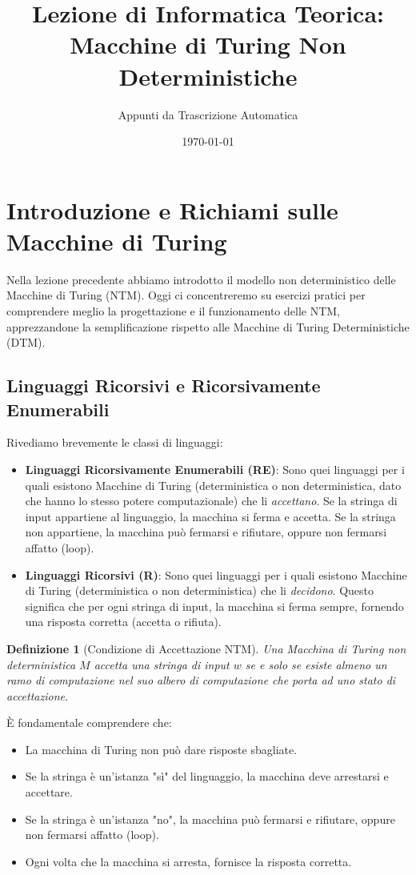 \documentclass[a4paper]{article}
\title{Lezione di Informatica Teorica: Macchine di Turing Non Deterministiche}
\author{Appunti da Trascrizione Automatica}
\date{\today}
\newtheorem{definition}{Definizione}[section]
\begin{document}
\maketitle
\tableofcontents
\newpage

\section{Introduzione e Richiami sulle Macchine di Turing}

Nella lezione precedente abbiamo introdotto il modello non deterministico delle Macchine di Turing (NTM). Oggi ci concentreremo su esercizi pratici per comprendere meglio la progettazione e il funzionamento delle NTM, apprezzandone la semplificazione rispetto alle Macchine di Turing Deterministiche (DTM).

\subsection{Linguaggi Ricorsivi e Ricorsivamente Enumerabili}

Rivediamo brevemente le classi di linguaggi:
\begin{itemize}
    \item \textbf{Linguaggi Ricorsivamente Enumerabili (RE)}: Sono quei linguaggi per i quali esistono Macchine di Turing (deterministica o non deterministica, dato che hanno lo stesso potere computazionale) che li \emph{accettano}. Se la stringa di input appartiene al linguaggio, la macchina si ferma e accetta. Se la stringa non appartiene, la macchina può fermarsi e rifiutare, oppure non fermarsi affatto (loop).
    \item \textbf{Linguaggi Ricorsivi (R)}: Sono quei linguaggi per i quali esistono Macchine di Turing (deterministica o non deterministica) che li \emph{decidono}. Questo significa che per ogni stringa di input, la macchina si ferma sempre, fornendo una risposta corretta (accetta o rifiuta).
\end{itemize}

\begin{definition}[Condizione di Accettazione NTM]
Una Macchina di Turing non deterministica $M$ accetta una stringa di input $w$ se e solo se esiste almeno un ramo di computazione nel suo albero di computazione che porta ad uno stato di accettazione.
\end{definition}

È fondamentale comprendere che:
\begin{itemize}
    \item La macchina di Turing non può dare risposte sbagliate.
    \item Se la stringa è un'istanza "sì" del linguaggio, la macchina deve arrestarsi e accettare.
    \item Se la stringa è un'istanza "no", la macchina può fermarsi e rifiutare, oppure non fermarsi affatto (loop).
    \item Ogni volta che la macchina si arresta, fornisce la risposta corretta.
\end{itemize}
\end{document}
